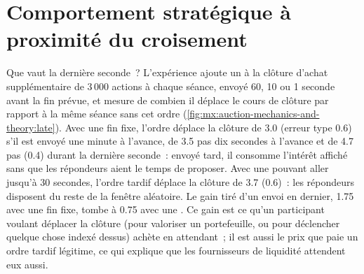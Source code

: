 \section{Comportement stratégique à proximité du croisement}

Que vaut la dernière seconde~? L'expérience ajoute un  à la clôture d'achat supplémentaire de 3\,000 actions à chaque séance, envoyé 60, 10 ou 1 seconde avant la
fin prévue, et mesure de combien il déplace le cours de clôture par rapport à la même séance sans cet ordre (\cref{fig:mx:auction-mechanics-and-theory:late}).
Avec une fin fixe, l'ordre déplace la clôture de 3.0  (erreur type 0.6) s'il est envoyé une minute à l'avance, de 3.5 pas dix secondes à l'avance et de 4.7 pas (0.4) durant la dernière seconde~:
envoyé tard, il consomme l'intérêt affiché sans que les répondeurs aient le temps de proposer. Avec une  pouvant aller jusqu'à 30 secondes, l'ordre tardif déplace la clôture de
3.7  (0.6)~: les répondeurs disposent du reste de la fenêtre aléatoire. Le gain tiré d'un envoi en dernier, 1.75  avec une fin fixe, tombe à 0.75 avec une
. Ce gain est ce qu'un participant voulant déplacer la clôture (pour valoriser un portefeuille, ou pour déclencher quelque chose indexé dessus) achète en attendant~; il est aussi
le prix que paie un ordre tardif légitime, ce qui explique que les fournisseurs de liquidité attendent eux aussi.

